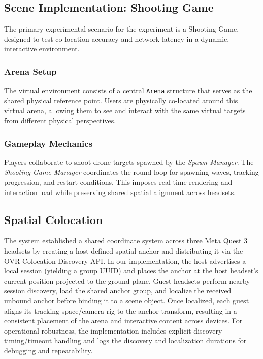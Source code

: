 \subsection{Scene Implementation: Shooting Game}

The primary experimental scenario for the experiment is a Shooting Game, designed to test co-location accuracy and network latency in a dynamic, interactive environment.

\subsubsection{Arena Setup}

The virtual environment consists of a central \texttt{Arena} structure that serves as the shared physical reference point. Users are physically co-located around this virtual arena, allowing them to see and interact with the same virtual targets from different physical perspectives.

\subsubsection{Gameplay Mechanics}
Players collaborate to shoot drone targets spawned by the \textit{Spawn Manager}. The \textit{Shooting Game Manager} coordinates the round loop for spawning waves, tracking progression, and restart conditions. This imposes real-time rendering and interaction load while preserving shared spatial alignment across headsets.


\subsection{Spatial Colocation}
\label{sec:prototype-colocation}

The system established a shared coordinate system across three Meta Quest 3 headsets by creating a host-defined spatial anchor and distributing it via the OVR Colocation Discovery API\cite{MetaColocationDiscovery2025}. In our implementation, the host advertises a local session (yielding a group UUID) and places the anchor at the host headset's current position projected to the ground plane. Guest headsets perform nearby session discovery, load the shared anchor group, and localize the received unbound anchor before binding it to a scene object. Once localized, each guest aligns its tracking space/camera rig to the anchor transform, resulting in a consistent placement of the arena and interactive content across devices.
For operational robustness, the implementation includes explicit discovery timing/timeout handling and logs the discovery and localization durations for debugging and repeatability.

